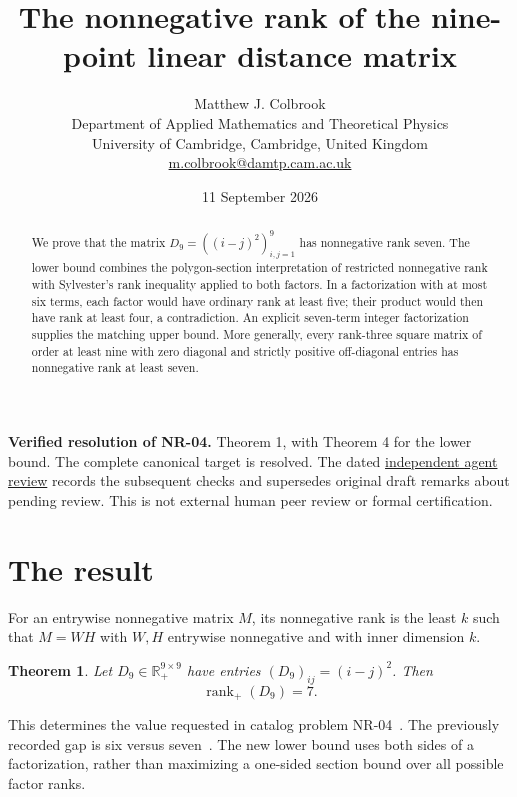 \documentclass[11pt]{article}
\title{The nonnegative rank of the nine-point linear distance matrix}
\author{Matthew J. Colbrook\\\small Department of Applied Mathematics and Theoretical Physics\\\small University of Cambridge, Cambridge, United Kingdom\\\small\href{mailto:m.colbrook@damtp.cam.ac.uk}{m.colbrook@damtp.cam.ac.uk}}\date{11 September 2026}
\newtheorem{theorem}{Theorem}
\newcommand{\rank}{\operatorname{rank}}
\newcommand{\R}{\mathbb R}
\begin{document}
\maketitle

\noindent\textbf{Verified resolution of NR-04.} Theorem 1, with Theorem 4 for the lower bound. The complete canonical target is resolved.
The dated \href{https://github.com/MColbrook/OpenProblemsInNLA/blob/codex/colbrook-factorization-resolutions/references/colbrook-factorization-2026-09-11/verification/reviews/NR-04-review.md}{independent agent review} records the subsequent checks and supersedes original draft remarks about pending review. This is not external human peer review or formal certification.
\par\medskip

\begin{abstract}
We prove that the matrix $D_9=((i-j)^2)_{i,j=1}^9$ has nonnegative rank seven. The lower bound combines the polygon-section interpretation of restricted nonnegative rank with Sylvester's rank inequality applied to both factors. In a factorization with at most six terms, each factor would have ordinary rank at least five; their product would then have rank at least four, a contradiction. An explicit seven-term integer factorization supplies the matching upper bound. More generally, every rank-three square matrix of order at least nine with zero diagonal and strictly positive off-diagonal entries has nonnegative rank at least seven.
\end{abstract}

\section{The result}
For an entrywise nonnegative matrix $M$, its nonnegative rank is the least $k$ such that $M=WH$ with $W,H$ entrywise nonnegative and with inner dimension $k$.
\begin{theorem}\label{thm:main}
Let $D_9\in\R_+^{9\times9}$ have entries $(D_9)_{ij}=(i-j)^2$. Then
\[
 \boxed{\rank_+(D_9)=7.}
\]
\end{theorem}
This determines the value requested in catalog problem NR-04~\cite{catalog}. The previously recorded gap is six versus seven~\cite{gg,bvg}. The new lower bound uses both sides of a factorization, rather than maximizing a one-sided section bound over all possible factor ranks.
\end{document}
